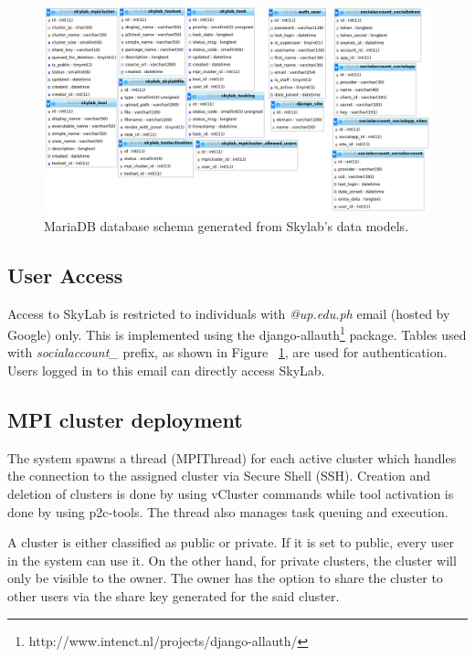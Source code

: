 	\begin{figure}[ht]
      \centering
      \includegraphics[scale=1.5]{./images/db_schema.png}
      \caption{\label{fig:dbschema}MariaDB database schema generated from Skylab's data models.}
    \end{figure}

\subsection{User Access}
Access to SkyLab is restricted to individuals with \textit{@up.edu.ph} email (hosted by Google) only. This is implemented  using the django-allauth\footnote{http://www.intenct.nl/projects/django-allauth/} package. Tables used with \textit{socialaccount\_} prefix, as shown in Figure ~\ref{fig:dbschema}, are used for authentication. Users logged in to this email can directly access SkyLab.


\subsection{MPI cluster deployment} 

The system spawns a thread (MPIThread) for each active cluster which handles the connection to the assigned cluster via Secure Shell (SSH). Creation and deletion of clusters is done by using vCluster commands while tool activation is done by using p2c-tools. The thread also manages task queuing and execution.
		
A cluster is either classified as public or private. If it is set to public, every user in the system can use it. On the other hand, for private clusters, the cluster will only be visible to the owner. The owner has the option to share the cluster to other users via the share key generated for the said cluster. 		

